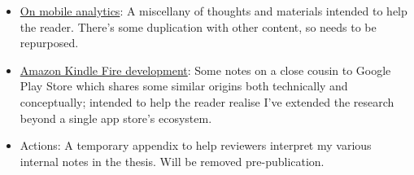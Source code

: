 \begin{itemize}
\begin{itemize}
        \item \href{appendix-on-mobile-analytics}{On mobile analytics}: A miscellany of thoughts and materials intended to help the reader. There's some duplication with other content, so needs to be repurposed.
        \item \href{appendix-kindle-fire-development}{Amazon Kindle Fire development}: Some notes on a close cousin to Google Play Store which shares some similar origins both technically and conceptually; intended to help the reader realise I've extended the research beyond a single app store's ecosystem.
        \item Actions: A temporary appendix to help reviewers interpret my various internal notes in the thesis. Will be removed pre-publication.
    \end{itemize}
    
\end{itemize}

